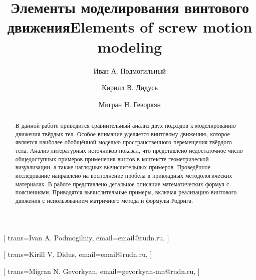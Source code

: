 \documentclass[%
]{ittmm}
\begin{document}



\title{Элементы моделирования винтового движения}
\title[mode=trans]{Elements of screw motion modeling}


\author[1]{Иван А. Подмогильный}[%
trans={Ivan A. Podmogilniy},
email=email@rudn.ru,
]
\cormark[1]

\author[1]{Кирилл В. Дидусь}[%
trans={Kirill V. Didus},
email=email@rudn.ru,
]

\author[1]{Мигран Н. Геворкян}[%
trans={Migran N. Gevorkyan},
email=gevorkyan-mn@rudn.ru,
]

\address[1]{Российский университет дружбы народов, ул. Миклухо-Маклая, д. 6, Москва, 117198, Российская Федерация}


\begin{abstract}
  В данной работе приводится сравнительный анализ двух подходов к моделированию движения твёрдых тел. Особое внимание уделяется винтовому движению, которое является наиболее обобщённой моделью пространственного перемещения твёрдого тела. Анализ литературных источников показал, что представлено недостаточное число общедоступных примеров применения винтов в контексте геометрической визуализации, а также наглядных вычислительных примеров. Проведённое исследование направлено на восполнение пробела в прикладных методологических материалах. В работе представлено детальное описание математических формул с пояснениями. Приводятся вычислительные примеры, включая реализацию винтового движения с использованием матричного метода и формулы Родрига.
\end{abstract}
\end{document}
